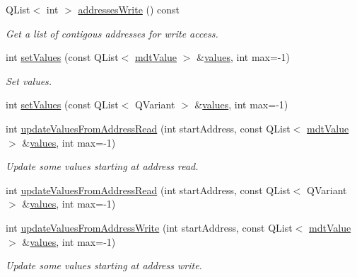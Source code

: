 \begin{DoxyCompactItemize}
Q\-List$<$ int $>$ \hyperlink{classmdt_device_ios_segment_a87429d142a5de4831623e04e6f8dabf9}{addresses\-Write} () const 
\begin{DoxyCompactList}\small\item\em Get a list of contigous addresses for write access. \end{DoxyCompactList}\item 
int \hyperlink{classmdt_device_ios_segment_a369b37d7b9db7d56e15765a44706e4d3}{set\-Values} (const Q\-List$<$ \hyperlink{classmdt_value}{mdt\-Value} $>$ \&\hyperlink{classmdt_device_ios_segment_a563da954d00404fbdaf45ea60a84b532}{values}, int max=-\/1)
\begin{DoxyCompactList}\small\item\em Set values. \end{DoxyCompactList}\item 
int \hyperlink{classmdt_device_ios_segment_a9eba9ce97404ea4fbcf89339a2e03502}{set\-Values} (const Q\-List$<$ Q\-Variant $>$ \&\hyperlink{classmdt_device_ios_segment_a563da954d00404fbdaf45ea60a84b532}{values}, int max=-\/1)
\item 
int \hyperlink{classmdt_device_ios_segment_af51f263e2a0f5db725cad4b867339cdf}{update\-Values\-From\-Address\-Read} (int start\-Address, const Q\-List$<$ \hyperlink{classmdt_value}{mdt\-Value} $>$ \&\hyperlink{classmdt_device_ios_segment_a563da954d00404fbdaf45ea60a84b532}{values}, int max=-\/1)
\begin{DoxyCompactList}\small\item\em Update some values starting at address read. \end{DoxyCompactList}\item 
int \hyperlink{classmdt_device_ios_segment_a521ec9f8fb527d1e95fc16ae87337a12}{update\-Values\-From\-Address\-Read} (int start\-Address, const Q\-List$<$ Q\-Variant $>$ \&\hyperlink{classmdt_device_ios_segment_a563da954d00404fbdaf45ea60a84b532}{values}, int max=-\/1)
\item 
int \hyperlink{classmdt_device_ios_segment_ae99f379be2908bd3d9774ddcb81bfbb0}{update\-Values\-From\-Address\-Write} (int start\-Address, const Q\-List$<$ \hyperlink{classmdt_value}{mdt\-Value} $>$ \&\hyperlink{classmdt_device_ios_segment_a563da954d00404fbdaf45ea60a84b532}{values}, int max=-\/1)
\begin{DoxyCompactList}\small\item\em Update some values starting at address write. \end{DoxyCompactList}\item 

\end{DoxyCompactItemize}
